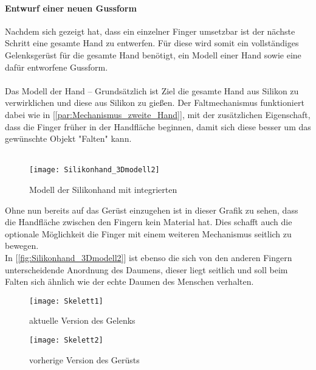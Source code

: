 \documentclass[titlepage,12pt,twoside]{article}
\begin{document}
\paragraph{Entwurf einer neuen Gussform}
\hfill \break
\hfill \break
Nachdem sich gezeigt hat, dass ein einzelner Finger umsetzbar ist der nächste Schritt eine gesamte Hand zu entwerfen. Für diese wird somit ein vollständiges Gelenksgerüst für die gesamte Hand benötigt, ein Modell einer Hand sowie eine dafür entworfene 
Gussform. \\
\\
Das Modell der Hand – Grundsätzlich ist Ziel die gesamte Hand aus Silikon zu verwirklichen und diese aus Silikon zu gießen. Der Faltmechanismus funktioniert dabei wie in [\textcolor{blue}{\autoref{par:Mechanismus_zweite_Hand}}], mit der zusätzlichen Eigenschaft, dass die Finger früher 
in der Handfläche beginnen, damit sich diese besser um das gewünschte Objekt "Falten" kann. \\
\\
\begin{figure}[H]
	\begin{center}
		\scalebox{0.8}
		{\texttt{[image: Silikonhand\_3Dmodell2]}}
		\caption{Modell der Silikonhand mit integrierten }
		\label{fig:Silikonhand_3Dmodell2}			
	\end{center}
\end{figure}
\hfill \break
Ohne nun bereits auf das Gerüst einzugehen ist in dieser Grafik zu sehen, dass die Handfläche zwischen den Fingern kein Material hat. Dies schafft auch die optionale Möglichkeit die Finger mit einem weiteren Mechanismus seitlich zu bewegen. \\
In [\textcolor{blue}{\autoref{fig:Silikonhand_3Dmodell2}}] ist ebenso die sich von den anderen Fingern unterscheidende Anordnung des Daumens, dieser liegt seitlich und soll beim Falten sich ähnlich wie der echte Daumen des Menschen verhalten. \\
\begin{figure}[H]
	\begin{center}
		\scalebox{0.8}
		{\texttt{[image: Skelett1]}}
		\caption{aktuelle Version des Gelenks}
		\label{fig:Skelett1}			
	\end{center}
\end{figure}
\begin{figure}[H]
	\begin{center}
		\scalebox{0.8}
		{\texttt{[image: Skelett2]}}
		\caption{vorherige Version des Gerüsts}
		\label{fig:Skelett2}			
	\end{center}
\end{figure}
\end{document}
